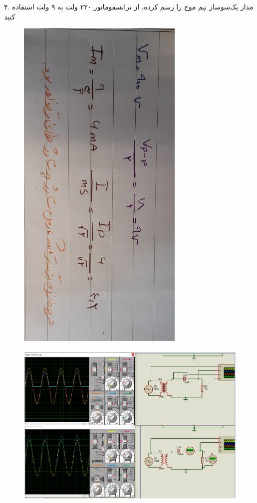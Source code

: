 \documentclass[12pt]{article}
\begin{document}
۴. مدار یک‌سوساز نیم موج را رسم کرده، از ترانسفوماتور ۲۲۰ ولت به ۹ ولت استفاده کنید

\begin{figure}[H]
	\begin{center}
		\includegraphics[width=8cm, height=\textwidth, angle=90]{./images/8.i.4}
	\end{center}
\end{figure}

\begin{figure}[H]
	\begin{center}
		\includegraphics[width=\textwidth, height=8cm]{./images/8.7}
	\end{center}
\end{figure}
\end{document}
